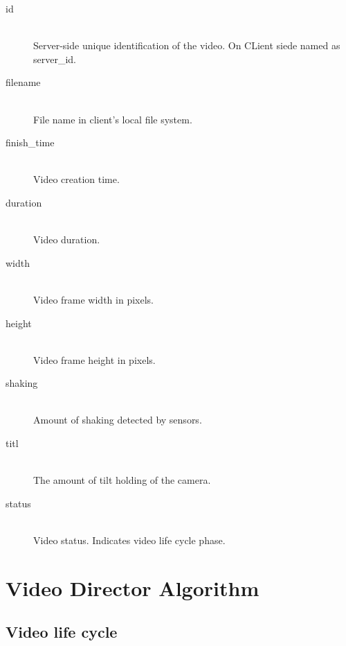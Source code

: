 \documentclass[conference]{IEEEtran}
\begin{document}
\begin{description}
	\item[id]\hfill\\
		Server-side unique identification of the video. On CLient siede named as server\_id.
		
	\item[filename]\hfill\\
		File name in client's local file system.
		
	\item[finish\_time]\hfill\\
		Video creation time.
		
	\item[duration]\hfill\\
		Video duration.
		
	\item[width]\hfill\\
		Video frame width in pixels.

	\item[height]\hfill\\
		Video frame height in pixels.		
	
	\item[shaking]\hfill\\
		Amount of shaking detected by sensors.

	\item[titl]\hfill\\
		The amount of tilt holding of the camera.
	
	\item[status]\hfill\\
		Video status. Indicates video life cycle phase.

		
\end{description}

\section{Video Director Algorithm}

\subsection{Video life cycle}
\end{document}
